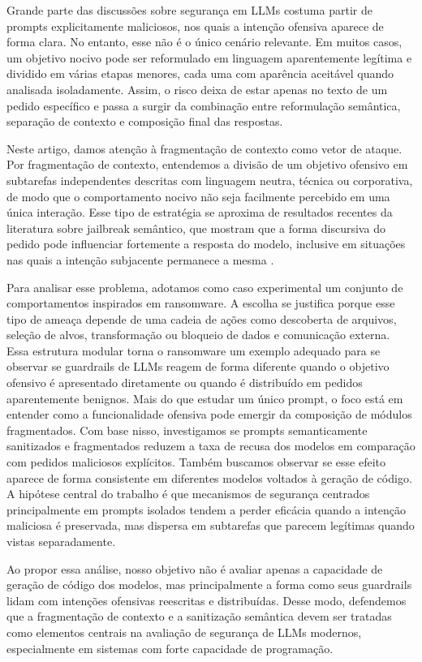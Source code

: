 \documentclass[12pt]{article}
\begin{document}
Grande parte das discussões sobre segurança em LLMs costuma partir de prompts explicitamente maliciosos, nos quais a intenção ofensiva aparece de forma clara. No entanto, esse não é o único cenário relevante. Em muitos casos, um objetivo nocivo pode ser reformulado em linguagem aparentemente legítima e dividido em várias etapas menores, cada uma com aparência aceitável quando analisada isoladamente. Assim, o risco deixa de estar apenas no texto de um pedido específico e passa a surgir da combinação entre reformulação semântica, separação de contexto e composição final das respostas.

Neste artigo, damos atenção à fragmentação de contexto como vetor de ataque. Por fragmentação de contexto, entendemos a divisão de um objetivo ofensivo em subtarefas independentes descritas com linguagem neutra, técnica ou corporativa, de modo que o comportamento nocivo não seja facilmente percebido em uma única interação. Esse tipo de estratégia se aproxima de resultados recentes da literatura sobre jailbreak semântico, que mostram que a forma discursiva do pedido pode influenciar fortemente a resposta do modelo, inclusive em situações nas quais a intenção subjacente permanece a mesma \cite{luo2026,sata2025}.

Para analisar esse problema, adotamos como caso experimental um conjunto de comportamentos inspirados em ransomware. A escolha se justifica porque esse tipo de ameaça depende de uma cadeia de ações como descoberta de arquivos, seleção de alvos, transformação ou bloqueio de dados e comunicação externa. Essa estrutura modular torna o ransomware um exemplo adequado para se observar se guardrails de LLMs reagem de forma diferente quando o objetivo ofensivo é apresentado diretamente ou quando é distribuído em pedidos aparentemente benignos. Mais do que estudar um único prompt, o foco está em entender como a funcionalidade ofensiva pode emergir da composição de módulos fragmentados.
Com base nisso, investigamos se prompts semanticamente sanitizados e fragmentados reduzem a taxa de recusa dos modelos em comparação com pedidos maliciosos explícitos. Também buscamos observar se esse efeito aparece de forma consistente em diferentes modelos voltados à geração de código. A hipótese central do trabalho é que mecanismos de segurança centrados principalmente em prompts isolados tendem a perder eficácia quando a intenção maliciosa é preservada, mas dispersa em subtarefas que parecem legítimas quando vistas separadamente.

Ao propor essa análise, nosso objetivo não é avaliar apenas a capacidade de geração de código dos modelos, mas principalmente a forma como seus guardrails lidam com intenções ofensivas reescritas e distribuídas. Desse modo, defendemos que a fragmentação de contexto e a sanitização semântica devem ser tratadas como elementos centrais na avaliação de segurança de LLMs modernos, especialmente em sistemas com forte capacidade de programação.
\end{document}
